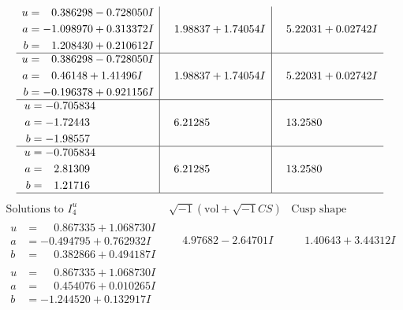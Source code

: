 \documentclass[1p]{elsarticle_modified}
\theoremstyle{definition}
\newcommand{\I}{\sqrt{-1}}
\begin{document}
$$\begin{array}{c|c|c}
\begin{aligned}
u &= \phantom{-}0.386298 - 0.728050 I \\
a &= -1.098970 + 0.313372 I \\
b &= \phantom{-}1.208430 + 0.210612 I\end{aligned}
 & \phantom{-}1.98837 + 1.74054 I & \phantom{-}5.22031 + 0.02742 I \\ \hline\begin{aligned}
u &= \phantom{-}0.386298 - 0.728050 I \\
a &= \phantom{-}0.46148 + 1.41496 I \\
b &= -0.196378 + 0.921156 I\end{aligned}
 & \phantom{-}1.98837 + 1.74054 I & \phantom{-}5.22031 + 0.02742 I \\ \hline\begin{aligned}
u &= -0.705834\phantom{ +0.000000I} \\
a &= -1.72443\phantom{ +0.000000I} \\
b &= -1.98557\phantom{ +0.000000I}\end{aligned}
 & \phantom{-}6.21285\phantom{ +0.000000I} & \phantom{-}13.2580\phantom{ +0.000000I} \\ \hline\begin{aligned}
u &= -0.705834\phantom{ +0.000000I} \\
a &= \phantom{-}2.81309\phantom{ +0.000000I} \\
b &= \phantom{-}1.21716\phantom{ +0.000000I}\end{aligned}
 & \phantom{-}6.21285\phantom{ +0.000000I} & \phantom{-}13.2580\phantom{ +0.000000I}\\
 \hline 
 \end{array}$$\newpage$$\begin{array}{c|c|c}  
\text{Solutions to }I^u_{4}& \I (\text{vol} + \sqrt{-1}CS) & \text{Cusp shape}\\
 \hline 
\begin{aligned}
u &= \phantom{-}0.867335 + 1.068730 I \\
a &= -0.494795 + 0.762932 I \\
b &= \phantom{-}0.382866 + 0.494187 I\end{aligned}
 & \phantom{-}4.97682 - 2.64701 I & \phantom{-}1.40643 + 3.44312 I \\ \hline\begin{aligned}
u &= \phantom{-}0.867335 + 1.068730 I \\
a &= \phantom{-}0.454076 + 0.010265 I \\
b &= -1.244520 + 0.132917 I\end{aligned}

\end{array}$$
\end{document}
